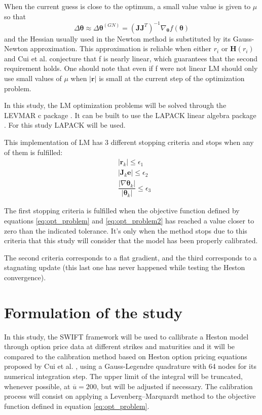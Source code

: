 \documentclass[12,twoside]{mammeTFM}
\theoremstyle{definition}
\theoremstyle{remark}
\begin{document}
When the current guess is close to the optimum, a small value value is given to $\mu$ so that
\begin{equation}
\Delta \boldsymbol{\theta} \approx \Delta \boldsymbol{\theta}^{(GN)} = (\boldsymbol{J}\boldsymbol{J}^{T})^{-1} \nabla_{\boldsymbol{\theta}} f(\boldsymbol{\theta})
\end{equation}
and the Hessian usually used in the Newton method is substituted by its Gauss-Newton approximation. This approximation is reliable when either $r_i$ or $\boldsymbol{H}(r_i)$ and Cui et al. \cite{cui17} conjecture that f is nearly linear, which guarantees that the second requirement holds. One should note that even if f were not linear LM should only use small values of $\mu$ when $|\boldsymbol{r}|$ is small at the current step of the optimization problem.

In this study, the LM optimization problems will be solved through the LEVMAR c package \cite{levmar}. It can be built to use the LAPACK linear algebra package \cite{lapack}. For this study LAPACK will be used.

This implementation of LM has 3 different stopping criteria and stops when any of them is fulfilled:
\begin{align}
&|\boldsymbol{r}_k| \leq \epsilon_1 \\
&|\boldsymbol{J}_k\boldsymbol{e}| \leq \epsilon_2 \\
&\dfrac{|\nabla \boldsymbol{\theta}_k|}{|\boldsymbol{\theta}_k|} \leq \epsilon_3
\end{align}

The first stopping criteria is fulfilled when the objective function defined by equations \ref{eq:opt_problem} and \ref{eq:opt_problem2} has reached a value closer to zero than the indicated tolerance. It's only when the method stops due to this criteria that this study will consider that the model has been properly calibrated.

The second criteria corresponds to a flat gradient, and the third corresponds to a stagnating update (this last one has never happened while testing the Heston convergence).

\section{Formulation of the study} \label{chapter:study}

In this study, the SWIFT framework will be used to callibrate a Heston model through option price data at different strikes and maturities and it will be compared to the calibration method based on Heston option pricing equations proposed by Cui et al. \cite{cui17}, using a Gauss-Legendre quadrature with 64 nodes for its numerical integration step. The upper limit of the integral will be truncated, whenever possible, at $\overline{u} = 200$, but will be adjusted if necessary. The calibration process will consist on applying a Levenberg–Marquardt method to the objective function defined in equation \ref{eq:opt_problem}.
\end{document}
